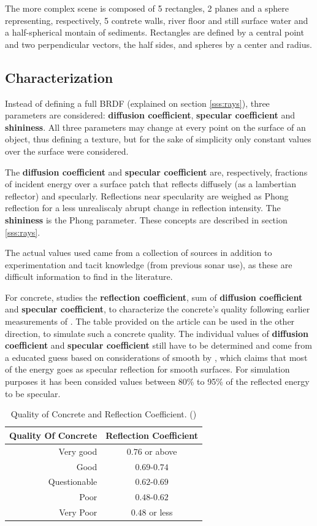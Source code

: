 The more complex scene is composed of 5 rectangles, 2 planes and a sphere
representing, respectively, 5 contrete walls, river floor and still surface
water and a half-spherical montain of sediments. Rectangles are defined by a
central point and two perpendicular vectors, the half sides, and spheres by a
center and radius.

\subsection{Characterization}

Instead of defining a full BRDF (explained on section
\ref{sss:rays}), three parameters are considered: \textbf{diffusion coefficient},
\textbf{specular coefficient} and \textbf{shininess}. All three parameters may
change at every point on the surface of an object, thus defining a texture, but
for the sake of simplicity only constant values over the surface were
considered.

The \textbf{diffusion coefficient} and \textbf{specular coefficient} are,
respectively, fractions of incident energy over a surface patch that reflects
diffusely (as a lambertian reflector) and specularly. Reflections near
specularity are weighed as Phong reflection for a less unrealiscaly abrupt
change in reflection intensity. The \textbf{shininess} is the Phong parameter.
These concepts are described in section \ref{sss:rays}.

The actual values used came from a collection of sources in addition to
experimentation and tacit knowledge (from previous sonar use), as these are
difficult information to find in the literature.

For concrete, \citet{chirp} studies the \textbf{reflection coefficient}, sum of
\textbf{diffusion coefficient} and \textbf{specular coefficient}, to
characterize the concrete's quality following earlier measurements of
\citet{leslie1949ultrasonic}. The table provided on the article can be used in
the other direction, to simulate such a concrete quality. The individual values of \textbf{diffusion coefficient} and \textbf{specular coefficient} still
have to be determined and come from a educated guess based on considerations of
smooth by \citet{Etter2013}, which claims that most of the energy goes as
specular reflection for smooth surfaces. For
simulation purposes it has been consided values between 80\% to 95\% of the reflected energy to be specular.

\begin{table}[ht]
\centering
\begin{tabular}{rc}
Quality Of Concrete & Reflection Coefficient \\
\hline
Very good & $0.76$ or above  \\
Good & $0.69$-$0.74$  \\
Questionable & $0.62$-$0.69$  \\
Poor & $0.48$-$0.62$  \\
Very Poor & $0.48$ or less  \\
\end{tabular}
\caption{Quality of Concrete and Reflection Coefficient.
(\citet{chirp,leslie1949ultrasonic})}
\end{table}

